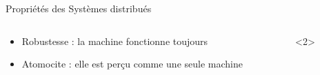 \documentclass[presentation]{beamer}
\begin{document}
\begin{frame}[label={sec:orgb3001bc}]{Propriétés des Systèmes distribués}
\begin{columns}
\begin{column}{0.46\columnwidth}
\begin{block}{}
\begin{itemize}
\item <1-> \alert{Robustesse} :  la machine fonctionne toujours
\item <2> \alert{Atomocite} : elle est perçu comme une seule machine
\end{itemize}
\end{block}
\end{column}

\begin{column}{0.46\columnwidth}
\begin{block}<2>{}


\end{block}
\end{column}
\end{columns}
\end{frame}
\end{document}
